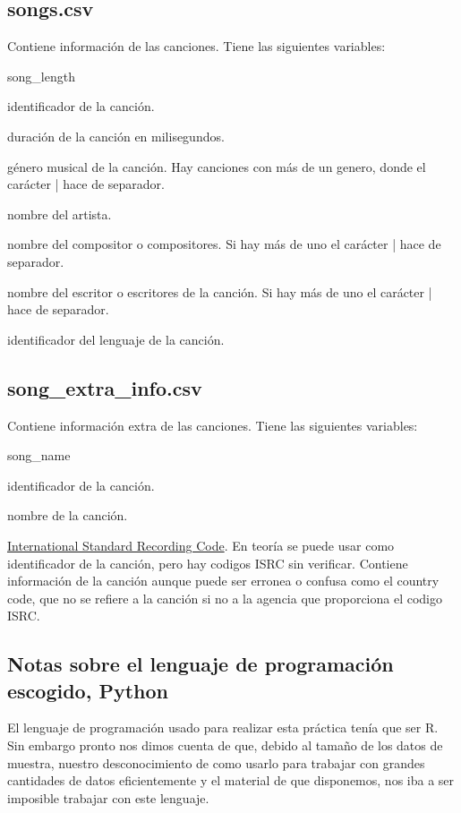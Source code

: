 \documentclass[a4paper]{article}
\begin{document}
\subsection*{songs.csv}

Contiene información de las canciones. Tiene las siguientes variables:

\begin{labeling}{song\_length}
\item [song\_id] identificador de la canción.
\item [song\_length] duración de la canción en milisegundos.
\item [genre\_ids] género musical de la canción. Hay canciones con más de un genero, donde el carácter | hace de separador.
\item [artist\_name] nombre del artista.
\item [composer] nombre del compositor o compositores. Si hay más de uno el carácter | hace de separador.
\item [lyricist] nombre del escritor o escritores de la canción. Si hay más de uno el carácter | hace de separador.
\item [language] identificador del lenguaje de la canción.
\end{labeling}

\subsection*{song\_extra\_info.csv}

Contiene información extra de las canciones. Tiene las siguientes variables:

\begin{labeling}{song\_name}
\item [song\_id] identificador de la canción.
\item [song\_name] nombre de la canción.
\item [isrc] \href{https://en.wikipedia.org/wiki/International_Standard_Recording_Code}{International Standard Recording Code}. En teoría se puede usar como identificador de la canción, pero hay codigos ISRC sin verificar. Contiene información de la canción aunque puede ser erronea o confusa como el country code, que no se refiere a la canción si no a la agencia que proporciona el codigo ISRC.
\end{labeling}




\subsection{Notas sobre el lenguaje de programación escogido, Python}
El lenguaje de programación usado para realizar esta práctica tenía que ser R. Sin embargo pronto nos dimos cuenta de que, debido al tamaño de los datos de muestra, nuestro desconocimiento de como usarlo para trabajar con grandes cantidades de datos eficientemente y el material de que disponemos, nos iba a ser imposible trabajar con este lenguaje.\\
\end{document}
